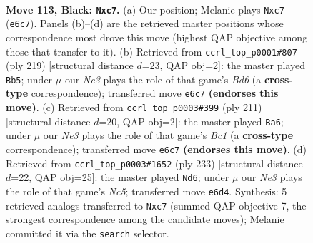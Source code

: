 \documentclass[11pt]{article}
\begin{document}
\clearpage

\begin{figure}[p]\centering
\begin{subfigure}{0.46\textwidth}\centering
\resizebox{\linewidth}{!}{%
\newchessgame
\chessboard[
  setfen={8/1BP3k1/4n3/6P1/6KP/8/8/8 b - - 2 113},
  showmover=false,
  pgfstyle=straightmove, color=movearrow, markmove={e6-c7}
]}
\caption{}
\end{subfigure}\hfill
\begin{subfigure}{0.46\textwidth}\centering
\resizebox{\linewidth}{!}{%
\newchessgame
\chessboard[
  setfen={1B6/8/7k/8/4P3/3bKP2/8/8 b - - 44 110},
  showmover=false,
  pgfstyle=straightmove, color=movearrow, markmove={d3-b5}
]}
\caption{}
\end{subfigure}
\\[4pt]
\begin{subfigure}{0.46\textwidth}\centering
\resizebox{\linewidth}{!}{%
\newchessgame
\chessboard[
  setfen={2b5/B7/6k1/6P1/5P2/6K1/8/8 b - - 2 106},
  showmover=false,
  pgfstyle=straightmove, color=movearrow, markmove={c8-a6}
]}
\caption{}
\end{subfigure}\hfill
\begin{subfigure}{0.46\textwidth}\centering
\resizebox{\linewidth}{!}{%
\newchessgame
\chessboard[
  setfen={8/8/8/k7/p1n3B1/P1P5/K7/8 b - - 17 117},
  showmover=false,
  pgfstyle=straightmove, color=movearrow, markmove={c4-d6}
]}
\caption{}
\end{subfigure}
\caption{\textbf{Move 113, Black: \texttt{Nxc7}.} (a) Our position; Melanie plays \texttt{Nxc7} (\texttt{e6c7}). Panels (b)--(d) are the retrieved master positions whose correspondence most drove this move (highest QAP objective among those that transfer to it). (b) Retrieved from \texttt{ccrl\_top\_p0001\#807} (ply 219) [structural distance $d$=23, QAP obj=2]: the master played \texttt{Bb5}; under $\mu$ our \emph{Ne3} plays the role of that game's \emph{Bd6} (a \textbf{cross-type} correspondence); transferred move \texttt{e6c7} \textbf{(endorses this move)}. (c) Retrieved from \texttt{ccrl\_top\_p0003\#399} (ply 211) [structural distance $d$=20, QAP obj=2]: the master played \texttt{Ba6}; under $\mu$ our \emph{Ne3} plays the role of that game's \emph{Bc1} (a \textbf{cross-type} correspondence); transferred move \texttt{e6c7} \textbf{(endorses this move)}. (d) Retrieved from \texttt{ccrl\_top\_p0003\#1652} (ply 233) [structural distance $d$=22, QAP obj=25]: the master played \texttt{Nd6}; under $\mu$ our \emph{Ne3} plays the role of that game's \emph{Nc5}; transferred move \texttt{e6d4}. Synthesis: 5 retrieved analogs transferred to \texttt{Nxc7} (summed QAP objective 7, the strongest correspondence among the candidate moves); Melanie committed it via the \texttt{search} selector.}
\label{fig:thought-m225}
\end{figure}
\end{document}
